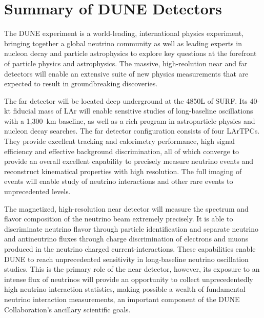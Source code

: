 \chapter{Summary of DUNE Detectors}
\label{ch:detectors-summary}

The DUNE experiment is a world-leading, international physics
experiment, bringing together a global neutrino community as well as
leading experts in nucleon decay and particle astrophysics to explore
key questions at the forefront of particle physics and
astrophysics. The massive, high-reolution near and far detectors will
enable an extensive suite of new physics measurements that are
expected to result in groundbreaking discoveries.

The far detector will be located deep underground at the 4850L of
SURF.  Its 40-kt fiducial mass of LAr will enable sensitive studies of
long-baseline oscillations with a 1,300~km baseline, as well as a rich
program in astroparticle physics and nucleon decay searches.  The far
detector configuration consists of four LArTPCs.  They provide
excellent tracking and calorimetry performance, high signal efficiency
and effective background discrimination, all of which converge to
provide an overall excellent capability to precisely measure neutrino
events and reconstruct kinematical properties with high
resolution. The full imaging of events will enable study of neutrino
interactions and other rare events to unprecedented levels.


The magnetized, high-resolution near detector will measure the
spectrum and flavor composition of the neutrino beam extremely
precisely. It is able to discriminate neutrino flavor through particle
identification and separate neutrino and antineutrino fluxes through
charge discrimination of electrons and muons produced in the neutrino
charged current-interactions. These capabilities enable DUNE to reach
unprecedented sensitivity in long-baseline neutrino oscillation
studies.  This is the primary role of the near detector, however, its
exposure to an intense flux of neutrinos will provide an opportunity
to collect unprecedentedly high neutrino interaction statistics,
making possible a wealth of fundamental neutrino interaction
measurements, an important component of the DUNE Collaboration's
ancillary scientific goals.
